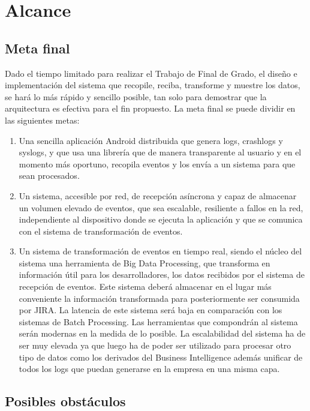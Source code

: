 \chapter{Alcance}

\section{Meta final}
Dado el tiempo limitado para realizar el Trabajo de Final de Grado, el diseño e implementación del sistema que recopile, reciba, transforme y muestre los datos, se hará lo más rápido y sencillo posible, tan solo para demostrar que la arquitectura es efectiva para el fin propuesto. La meta final se puede dividir en las siguientes metas:

\begin{enumerate}
	
	\item Una sencilla aplicación Android distribuida que genera logs, crashlogs y syslogs, y que usa una librería que de manera transparente al usuario y en el momento más oportuno, recopila eventos y los envía a un sistema para que sean procesados. 
	
	\item Un sistema, accesible por red, de recepción asíncrona y capaz de almacenar un volumen elevado de eventos, que sea escalable, resiliente a fallos en la red, independiente al dispositivo donde se ejecuta la aplicación y que se comunica con el sistema de transformación de eventos.
	
	\item Un sistema de transformación de eventos en tiempo real, siendo el núcleo del sistema una herramienta de Big Data Processing, que transforma en información útil para los desarrolladores, los datos recibidos por el sistema de recepción de eventos. Este sistema deberá almacenar en el lugar más conveniente la información transformada para posteriormente ser consumida por JIRA. La latencia de este sistema será baja en comparación con los sistemas de Batch Processing. Las herramientas que compondrán al sistema serán modernas en la medida de lo posible. La escalabilidad del sistema ha de ser muy elevada ya que luego ha de poder ser utilizado para procesar otro tipo de datos como los derivados del Business Intelligence además unificar de todos los logs que puedan generarse en la empresa en una misma capa.
	
\end{enumerate}

\section{Posibles obstáculos}
